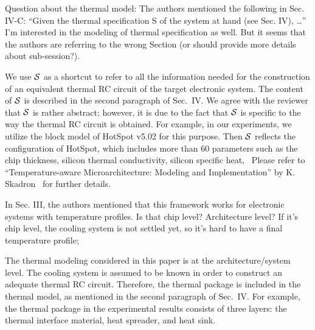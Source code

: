 \begin{reviewer}
Question about the thermal model: The authors mentioned the following in Sec. IV-C: ``Given the thermal specification S of the system at hand (see Sec. IV), \ldots'' I’m interested in the modeling of thermal specification as well. But it seems that the authors are referring to the wrong Section (or should provide more details about sub-session?).
\end{reviewer}
\begin{authors}
We use $\mathcal{S}$ as a shortcut to refer to all the information needed for the construction of an equivalent thermal RC circuit of the target electronic system.
The content of $\mathcal{S}$ is described in the second paragraph of Sec.~IV.
We agree with the reviewer that $\mathcal{S}$ is rather abstract; however, it is due to the fact that $\mathcal{S}$ is specific to the way the thermal RC circuit is obtained.
For example, in our experiments, we utilize the block model of HotSpot v5.02 for this purpose.
Then $\mathcal{S}$ reflects the configuration of HotSpot, which includes more than 60 parameters such as the chip thickness, silicon thermal conductivity, silicon specific heat, \etc\ Please refer to ``Temperature-aware Microarchitecture: Modeling and Implementation'' by K. Skadron \etal\ for further details.

\begin{actions}
\end{actions}
\end{authors}

\begin{reviewer}
In Sec. III, the authors mentioned that this framework works for electronic systems with temperature profiles. Is that chip level? Architecture level? If it’s chip level, the cooling system is not settled yet, so it’s hard to have a final temperature profile;
\end{reviewer}
\begin{authors}
The thermal modeling considered in this paper is at the architecture/system level.
The cooling system is assumed to be known in order to construct an adequate thermal RC circuit.
Therefore, the thermal package is included in the thermal model, as mentioned in the second paragraph of Sec.~IV.
For example, the thermal package in the experimental results consists of three layers: the thermal interface material, heat spreader, and heat sink.

\begin{actions}
\end{actions}
\end{authors}

